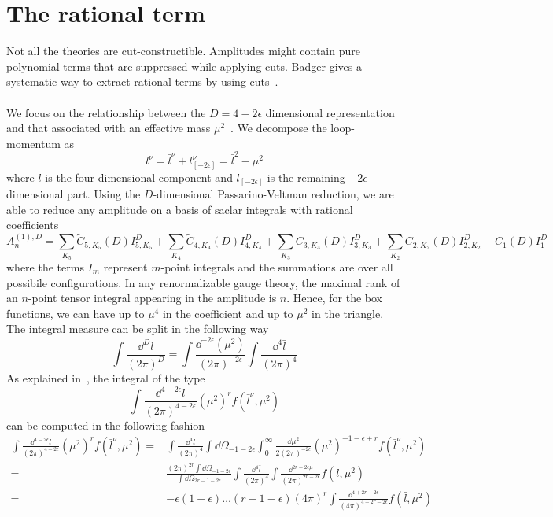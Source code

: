 \section{The rational term}
Not all the theories are cut-constructible. 
Amplitudes might contain pure polynomial terms that are suppressed while applying cuts. 
Badger gives a systematic way to extract rational terms by using cuts~\cite{Badger:2008cm}.
\\\\
We focus on the relationship between the $D = 4-2\epsilon$ dimensional representation and that associated with an effective mass $\mu^2$~\cite{Mahlon:1993si}.
We decompose the loop-momentum as
\begin{equation*}
l^\nu = \bar{l}^\nu + l_{[-2\epsilon]}^\nu = \bar{l}^2 - \mu^2
\end{equation*}
where $\bar{l}$ is the four-dimensional component and $l_{[-2\epsilon]}$ is the remaining $-2\epsilon$ dimensional part.
Using the $D$-dimensional Passarino-Veltman reduction, we are able to reduce any amplitude on a basis of saclar integrals with rational coefficients
\begin{equation*}
A_n^{(1),D} = \sum_{K_5} \tilde{C}_{5,K_5}(D) I^D_{5,K_5}
+\sum_{K_4} \tilde{C}_{4,K_4}(D) I^D_{4,K_4}
+\sum_{K_3} C_{3,K_3}(D) I^D_{3,K_3}
+\sum_{K_2} C_{2,K_2}(D) I^D_{2,K_2}
+C_1(D)I_1^D
\end{equation*}
where the terms $I_m$ represent $m$-point integrals and the summations are over all possibile configurations.
In any renormalizable gauge theory, the maximal rank of an $n$-point tensor integral appearing in the amplitude is $n$.
Hence, for the box functions, we can have up to $\mu^4$ in the coefficient and up to $\mu^2$ in the triangle.
The integral measure can be split in the following way
\begin{equation*}
\int\frac{\dd^D l}{(2\pi)^D} = 
\int\frac{\dd^{-2\epsilon}(\mu^2)}{(2\pi)^{-2\epsilon}}\int\frac{\dd^4 \bar{l}}{(2\pi)^4}
\end{equation*}
As explained in~\cite{Bern:1995db}, the integral of the type
\begin{equation*}
\int\frac{\dd^{4-2\epsilon} l}{(2\pi)^{4-2\epsilon}} (\mu^2)^rf(
\bar{l}^\nu,\mu^2) 
\end{equation*}
can be computed in the following fashion
\begin{equation*}
\begin{split}
\int\frac{\dd^{4-2\epsilon} \bar{l}}{(2\pi)^{4-2\epsilon}} (\mu^2)^rf(
\bar{l}^\nu,\mu^2) 
= & \int\frac{\dd^{4} \bar{l}}{(2\pi)^{4}} \int \dd\Omega_{-1-2\epsilon}\int_0^\infty \frac{\dd \mu^2}{2(2\pi)^{-2\epsilon}}(\mu^2)^{-1-\epsilon +r}f(\bar{l}^\nu, \mu^2)
\\ 
= & \frac{(2\pi)^{2r}\int\dd\Omega_{-1-2\epsilon}}{\int\dd\Omega_{2r-1-2\epsilon}} 
\int\frac{\dd^4 \bar{l}}{(2\pi)^4}\int\frac{\dd^{2r-2\epsilon \mu}}{(2\pi)^{2r-2\epsilon}}f(\bar{l},\mu^2)
\\
= &
-\epsilon(1-\epsilon)\ldots(r-1-\epsilon)(4\pi)^{r}\int\frac{\dd^{4+2r-2\epsilon}}{(4\pi)^{4+2r-2\epsilon}}f(\bar{l},\mu^2)
\end{split}
\end{equation*}

